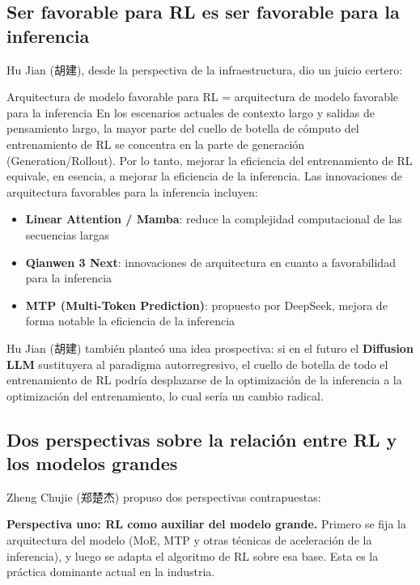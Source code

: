 \documentclass[a4paper]{article}
\begin{document}
\subsection{Ser favorable para RL es ser favorable para la inferencia}

Hu Jian (胡建), desde la perspectiva de la infraestructura, dio un juicio certero:

\begin{importantbox}{Arquitectura de modelo favorable para RL = arquitectura de modelo favorable para la inferencia}
En los escenarios actuales de contexto largo y salidas de pensamiento largo, la mayor parte del cuello de botella de cómputo del entrenamiento de RL se concentra en la parte de generación (Generation/Rollout). Por lo tanto, mejorar la eficiencia del entrenamiento de RL equivale, en esencia, a mejorar la eficiencia de la inferencia. Las innovaciones de arquitectura favorables para la inferencia incluyen:
\begin{itemize}
    \item \textbf{Linear Attention / Mamba}: reduce la complejidad computacional de las secuencias largas
    \item \textbf{Qianwen 3 Next}: innovaciones de arquitectura en cuanto a favorabilidad para la inferencia
    \item \textbf{MTP (Multi-Token Prediction)}: propuesto por DeepSeek, mejora de forma notable la eficiencia de la inferencia
\end{itemize}
\end{importantbox}

Hu Jian (胡建) también planteó una idea prospectiva: si en el futuro el \textbf{Diffusion LLM} sustituyera al paradigma autorregresivo, el cuello de botella de todo el entrenamiento de RL podría desplazarse de la optimización de la inferencia a la optimización del entrenamiento, lo cual sería un cambio radical.

\subsection{Dos perspectivas sobre la relación entre RL y los modelos grandes}

Zheng Chujie (郑楚杰) propuso dos perspectivas contrapuestas:

\textbf{Perspectiva uno: RL como auxiliar del modelo grande.} Primero se fija la arquitectura del modelo (MoE, MTP y otras técnicas de aceleración de la inferencia), y luego se adapta el algoritmo de RL sobre esa base. Esta es la práctica dominante actual en la industria.
\end{document}

